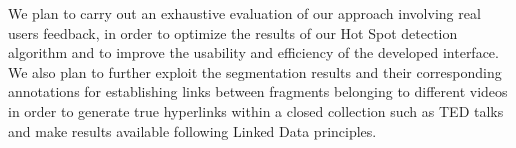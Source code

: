 \documentclass{llncs}
\begin{document}
We plan to carry out an exhaustive evaluation of our approach involving real users feedback, in order to optimize the results of our Hot Spot detection algorithm and to improve the usability and efficiency of the developed interface. We also plan to further exploit the segmentation results and their corresponding annotations for establishing links between fragments belonging to different videos in order to generate true hyperlinks within a closed collection such as TED talks and make results available following Linked Data principles.





\end{document}
